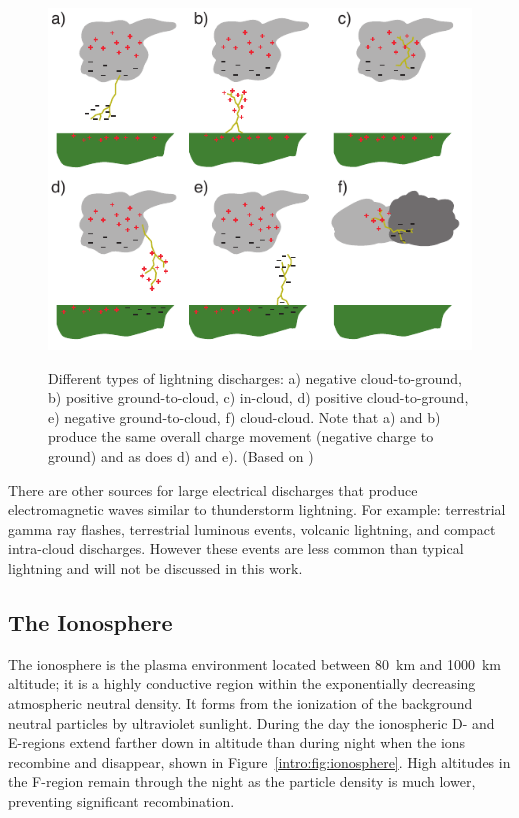 \begin{figure}[ht!]
	\centering
	\includegraphics[scale=1]{Introduction/Figures/lightning_types.pdf}\\
	\caption{Different types of lightning discharges:
			a) negative cloud-to-ground,
			b) positive ground-to-cloud,
			c) in-cloud,
			d) positive cloud-to-ground,
			e) negative ground-to-cloud,
			f) cloud-cloud.
			Note that a) and b) produce the same overall charge movement (negative charge to ground) and as does d) and e).
			 (Based on \citet{Uman1969})}
	\label{intro:fig:types}
\end{figure}

There are other sources for large electrical discharges that produce electromagnetic waves similar to thunderstorm lightning.
For example: terrestrial gamma ray flashes, terrestrial luminous events, volcanic lightning, and compact intra-cloud discharges.
However these events are less common than typical lightning and will not be discussed in this work.

\subsection{The Ionosphere}

The ionosphere is the plasma environment located between 80~km and 1000~km altitude; it is a highly conductive region within the exponentially decreasing atmospheric neutral density.
It forms from the ionization of the background neutral particles by ultraviolet sunlight.
During the day the ionospheric D- and E-regions extend farther down in altitude than during night when the ions recombine and disappear, shown in Figure~\ref{intro:fig:ionosphere}.
High altitudes in the F-region remain through the night as the particle density is much lower, preventing significant recombination.

